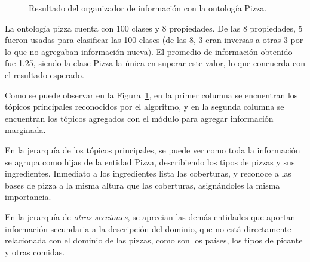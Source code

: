 \begin{figure}
\begin{multicols}{2}
\begin{figure}[H]
\end{figure}

\begin{figure}[H]
\end{figure}

\end{multicols}
\caption{Resultado del organizador de información con la ontología Pizza.}
\label{fig:caso_estudio_pizza}
\end{figure}

La ontología pizza cuenta con 100 clases y 8 propiedades. De las 8 propiedades, 5 fueron usadas  para clasificar las 100 clases (de las 8, 3 eran inversas a otras 3 por lo que no agregaban información nueva). El promedio de información obtenido fue 1.25, siendo la clase Pizza la única en superar este valor, lo que concuerda con el resultado esperado.

Como se puede observar en la Figura~\ref{fig:caso_estudio_pizza}, en la primer columna se encuentran los tópicos principales reconocidos por el algoritmo, y en la segunda columna se encuentran los tópicos agregados con el módulo para agregar información marginada.

En la jerarquía de los tópicos principales, se puede ver como toda la información se agrupa como hijas de la entidad Pizza, describiendo los tipos de pizzas y sus ingredientes. Inmediato a los ingredientes lista las coberturas, y reconoce a las bases de pizza a la misma altura que las coberturas, asignándoles la misma importancia.

En la jerarquía de \emph{otras secciones}, se aprecian las demás entidades que aportan información secundaria a la descripción del dominio, que no está directamente relacionada con el dominio de las pizzas, como son los países, los tipos de picante y otras comidas.

